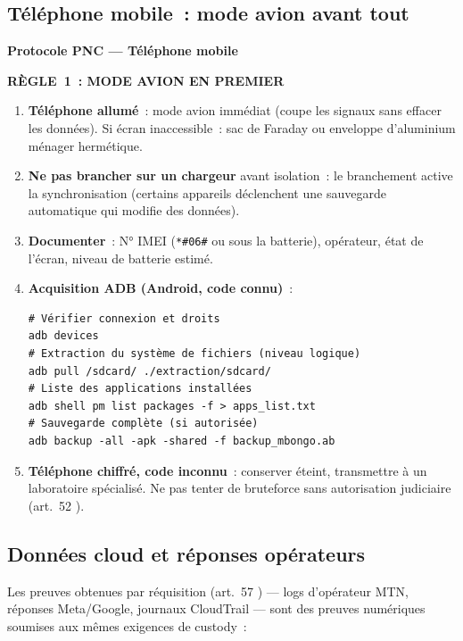 \subsection{Téléphone mobile~: mode avion avant tout}

\begin{boxPNC}
\textbf{Protocole PNC --- Téléphone mobile}

\begin{center}\textbf{RÈGLE~1~: MODE AVION EN PREMIER}\end{center}

\begin{enumerate}
    \item \textbf{Téléphone allumé}~: mode avion immédiat (coupe les signaux
          sans effacer les données). Si écran inaccessible~: sac de Faraday
          ou enveloppe d'aluminium ménager hermétique.
    \item \textbf{Ne pas brancher sur un chargeur} avant isolation~: le
          branchement active la synchronisation (certains appareils déclenchent
          une sauvegarde automatique qui modifie des données).
    \item \textbf{Documenter}~: N° IMEI (\texttt{*\#06\#} ou sous la batterie),
          opérateur, état de l'écran, niveau de batterie estimé.
    \item \textbf{Acquisition ADB (Android, code connu)}~:
          \begin{lstlisting}[language=bash_forensique]
# Vérifier connexion et droits
adb devices
# Extraction du système de fichiers (niveau logique)
adb pull /sdcard/ ./extraction/sdcard/
# Liste des applications installées
adb shell pm list packages -f > apps_list.txt
# Sauvegarde complète (si autorisée)
adb backup -all -apk -shared -f backup_mbongo.ab
          \end{lstlisting}
    \item \textbf{Téléphone chiffré, code inconnu}~: conserver éteint,
          transmettre à un laboratoire spécialisé. Ne pas tenter de bruteforce
          sans autorisation judiciaire (art.~52 ).
\end{enumerate}
\end{boxPNC}

\subsection{Données cloud et réponses opérateurs}

Les preuves obtenues par réquisition (art.~57 ) --- logs
d'opérateur MTN, réponses Meta/Google, journaux CloudTrail --- sont
des preuves numériques soumises aux mêmes exigences de custody~:

